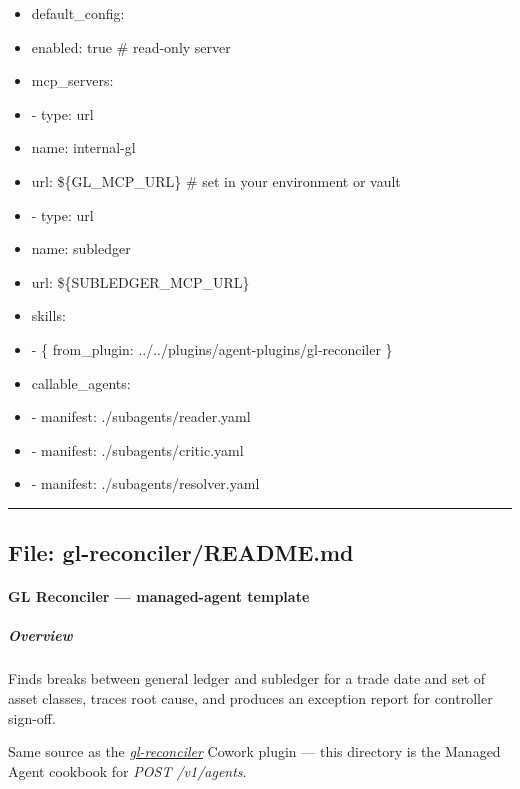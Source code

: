 \documentclass[11pt]{article}
\begin{document}
\begin{itemize}[leftmargin=*,itemsep=2pt,topsep=2pt]
\item {} default\_\allowbreak{}config:
\item {} enabled: true \# read-only server
\item {} mcp\_\allowbreak{}servers:
\item {} - type: url
\item {} name: internal-gl
\item {} url: \$\{GL\_\allowbreak{}MCP\_\allowbreak{}URL\} \# set in your environment or vault
\item {} - type: url
\item {} name: subledger
\item {} url: \$\{SUBLEDGER\_\allowbreak{}MCP\_\allowbreak{}URL\}
\item {} skills:
\item {} - \{ from\_\allowbreak{}plugin: ../../plugins/agent-plugins/gl-reconciler \}
\item {} callable\_\allowbreak{}agents:
\item {} - manifest: ./subagents/reader.yaml
\item {} - manifest: ./subagents/critic.yaml
\item {} - manifest: ./subagents/resolver.yaml
\end{itemize}

\vspace{0.8em}\hrule\vspace{0.8em}

\subsection{File: gl-reconciler/README.md}\label{file:gl-reconciler-README-md}

\paragraph{GL Reconciler — managed-agent template}\mbox{}\par

\subparagraph{Overview}\mbox{}\par

Finds breaks between general ledger and subledger for a trade date and set of asset classes, traces root cause, and produces an exception report for controller sign-off.


Same source as the \href{../../plugins/agent-plugins/gl-reconciler}{\emph{gl-reconciler}} Cowork plugin — this directory is the Managed Agent cookbook for \emph{POST /v1/agents}.
\end{document}
